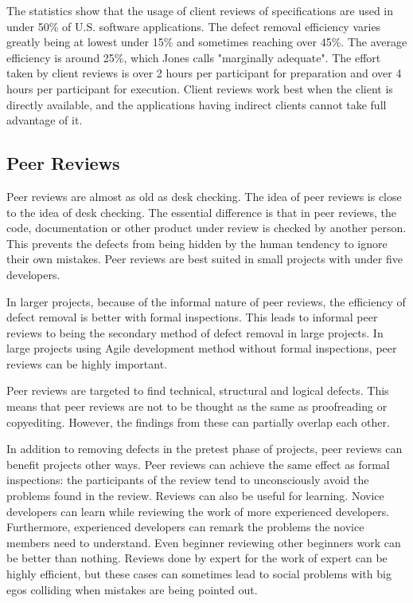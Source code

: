 The statistics show that the usage of client reviews of specifications are used in under 50\% of U.S. software applications. The defect removal efficiency varies greatly being at lowest under 15\% and sometimes reaching over 45\%. The average efficiency is around 25\%, which Jones calls "marginally adequate". The effort taken by client reviews is over 2 hours per participant for preparation and over 4 hours per participant for execution. Client reviews work best when the client is directly available, and the applications having indirect clients cannot take full advantage of it.

\subsection{Peer Reviews} 
\label{subsec:peerreview}

Peer reviews are almost as old as desk checking. The idea of peer reviews is close to the idea of desk checking. The essential difference is that in peer reviews, the code, documentation or other product under review is checked by another person. This prevents the defects from being hidden by the human tendency to ignore their own mistakes. Peer reviews are best suited in small projects with under five developers. 

In larger projects, because of the informal nature of peer reviews, the efficiency of defect removal is better with formal inspections. This leads to informal peer reviews to being the secondary method of defect removal in large projects. In large projects using Agile development method without formal inspections, peer reviews can be highly important.

Peer reviews are targeted to find technical, structural and logical defects. This means that peer reviews are not to be thought as the same as proofreading or copyediting. However, the findings from these can partially overlap each other.

In addition to removing defects in the pretest phase of projects, peer reviews can benefit projects other ways. Peer reviews can achieve the same effect as formal inspections: the participants of the review tend to unconsciously avoid the problems found in the review. Reviews can also be useful for learning. Novice developers can learn while reviewing the work of more experienced developers. Furthermore, experienced developers can remark the problems the novice members need to understand. Even beginner reviewing other beginners work can be better than nothing. Reviews done by expert for the work of expert can be highly efficient, but these cases can sometimes lead to social problems with big egos colliding when mistakes are being pointed out.

